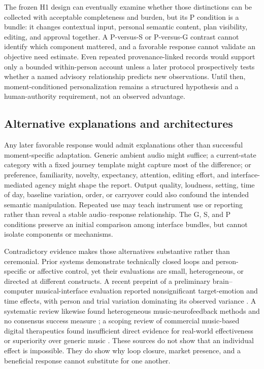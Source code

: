 The frozen H1 design can eventually examine whether those distinctions can be
collected with acceptable completeness and burden, but its P condition is a
bundle: it changes contextual input, personal semantic content, plan visibility,
editing, and approval together. A P-versus-S or P-versus-G contrast cannot
identify which component mattered, and a favorable response cannot validate an
objective need estimate. Even repeated provenance-linked records would support
only a bounded within-person account unless a later protocol prospectively
tests whether a named advisory relationship predicts new observations. Until
then, moment-conditioned personalization remains a structured hypothesis and a
human-authority requirement, not an observed advantage.

\subsection{Alternative explanations and architectures}
\label{sec:discussion-alternatives}

Any later favorable response would admit explanations other than successful
moment-specific adaptation. Generic ambient audio might suffice; a current-state
category with a fixed journey template might capture most of the difference; or
preference, familiarity, novelty, expectancy, attention, editing effort, and
interface-mediated agency might shape the report. Output quality, loudness,
setting, time of day, baseline variation, order, or carryover could also
confound the intended semantic manipulation. Repeated use may teach instrument
use or reporting rather than reveal a stable audio--response relationship. The
G, S, and P conditions preserve an initial comparison among interface bundles,
but cannot isolate components or mechanisms.

Contradictory evidence makes those alternatives substantive rather than
ceremonial. Prior systems demonstrate technically closed loops and
person-specific or affective control, yet their evaluations are small,
heterogeneous, or directed at different constructs. A recent preprint of a
preliminary brain--computer musical-interface evaluation reported nonsignificant
target-emotion and time effects, with person and trial variation dominating its
observed variance \citep{monroy2026minimalist}. A systematic review likewise
found heterogeneous
music-neurofeedback methods and no consensus success measure
\citep{sayal2025musicloop}; a scoping review of commercial music-based digital
therapeutics found insufficient direct evidence for real-world effectiveness
or superiority over generic music \citep{venkatesan2026mdt}. These sources do
not show that an individual effect is impossible. They do show why loop closure,
market presence, and a beneficial response cannot substitute for one another.

